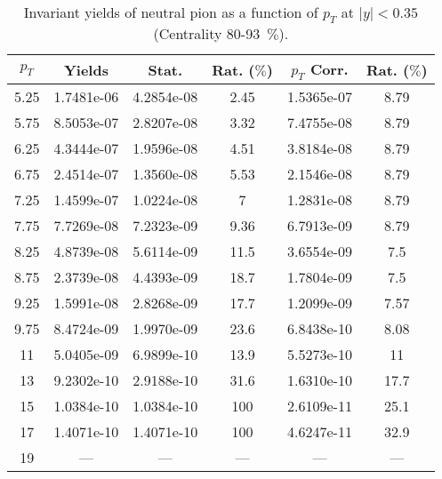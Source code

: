             
\begin{table}[!htb]
\centering
\begin{tabular}{|c|c|c|c|c|c|}
\hline
$p_{T}$ & Yields & Stat. & Rat. ($\%$) & $p_{T}$ Corr. & Rat. ($\%$) \\
\hline
5.25 & 1.7481e-06 & 4.2854e-08 & 2.45 & 1.5365e-07 & 8.79 \\ 
5.75 & 8.5053e-07 & 2.8207e-08 & 3.32 & 7.4755e-08 & 8.79 \\ 
6.25 & 4.3444e-07 & 1.9596e-08 & 4.51 & 3.8184e-08 & 8.79 \\ 
6.75 & 2.4514e-07 & 1.3560e-08 & 5.53 & 2.1546e-08 & 8.79 \\ 
7.25 & 1.4599e-07 & 1.0224e-08 & 7 & 1.2831e-08 & 8.79 \\ 
7.75 & 7.7269e-08 & 7.2323e-09 & 9.36 & 6.7913e-09 & 8.79 \\ 
8.25 & 4.8739e-08 & 5.6114e-09 & 11.5 & 3.6554e-09 & 7.5 \\ 
8.75 & 2.3739e-08 & 4.4393e-09 & 18.7 & 1.7804e-09 & 7.5 \\ 
9.25 & 1.5991e-08 & 2.8268e-09 & 17.7 & 1.2099e-09 & 7.57 \\ 
9.75 & 8.4724e-09 & 1.9970e-09 & 23.6 & 6.8438e-10 & 8.08 \\ 
11 & 5.0405e-09 & 6.9899e-10 & 13.9 & 5.5273e-10 & 11 \\ 
13 & 9.2302e-10 & 2.9188e-10 & 31.6 & 1.6310e-10 & 17.7 \\ 
15 & 1.0384e-10 & 1.0384e-10 & 100 & 2.6109e-11 & 25.1 \\ 
17 & 1.4071e-10 & 1.4071e-10 & 100 & 4.6247e-11 & 32.9 \\ 
19 & --- & --- & --- & --- & --- \\ 
\hline
\end{tabular}
\caption{Invariant yields of neutral pion as a function of $p_{T}$ at $|y|<0.35$ (Centrality 80-93~$\%$).}
\end{table}
            
